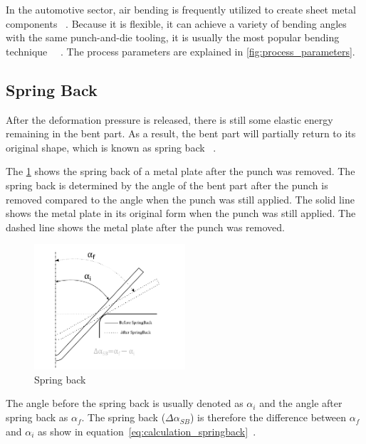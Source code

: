 In the automotive sector, air bending is frequently utilized to create sheet metal components
~\cite[p. 342]{kim2007prediction}.
Because it is flexible, it can achieve a variety of bending angles with the same punch-and-die tooling, it
is usually the most popular bending technique
~\cite[p. 3]{miranda_formingspringbackprediction_2018}~\cite[p. 1]{cruz2021application}.
The process parameters are explained in \cref{fig:process_parameters}.

\subsection{Spring Back}\label{subsubsec:spring-back}
After the deformation pressure is released, there is still
some elastic energy remaining in the bent part.
As a result, the bent part will partially return to its original
shape, which is known as spring back
~\cite[p. 413--414]{groover2020fundamentals}.

The \cref{fig:spring-back} shows the spring back of a metal plate after the punch was removed.
The spring back is determined by the angle of the bent part after the punch is removed compared to the angle when
the punch was still applied.
The solid line shows the metal plate in its original form when the punch was still
applied.
The dashed line shows the metal plate after the punch was removed.

\begin{figure}[h]
    \centering
    \includegraphics[width=0.5\textwidth]{chap3/images/spring-back}
    \caption{Spring back~\cite[p. 5]{cruz2021application}}
    \label{fig:spring-back}
\end{figure}

The angle before the spring back is usually denoted as $\alpha_i$ and the angle after spring back as $\alpha_f$.
The spring back ($\Delta \alpha_{SB}$) is therefore the difference between $\alpha_f$ and
$\alpha_i$ as show in equation~\ref*{eq:calculation_springback}~\cite[p. 6]{cruz2021application}.



